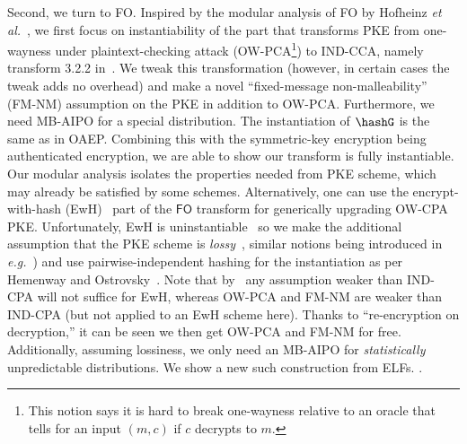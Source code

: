 Second, we turn to FO. Inspired by the modular analysis of FO by Hofheinz \emph{et al.}~\cite{TCC:HofHovKil17}, we first focus on instantiability of the part that transforms PKE from one-wayness under plaintext-checking attack (OW-PCA\footnote{This notion says it is hard to break one-wayness relative to an oracle that tells for an input $(m,c)$ if $c$ decrypts to $m$.}) to IND-CCA, namely transform 3.2.2 in~\cite{TCC:HofHovKil17}. 
We tweak this transformation (however, in certain cases the tweak adds no overhead) and make a novel  ``fixed-message non-malleability'' (FM-NM) assumption on the PKE in addition to OW-PCA.  Furthermore, we need MB-AIPO for a special distribution. The instantiation of $\hashG$ is the same as in OAEP. Combining this with the symmetric-key encryption being  authenticated encryption, we are able to show our transform is fully instantiable.  
Our modular analysis isolates the properties needed from PKE scheme, which may already be satisfied by some schemes.
Alternatively, one can use the encrypt-with-hash (EwH)~\cite{C:BelBolONe07} part of the $\mathsf{FO}$ transform for generically upgrading OW-CPA PKE. Unfortunately, EwH is uninstantiable~\cite{TCC:BrzFarMit15,FOCS:GoyKopWat17} so we make the additional assumption that the PKE scheme is \emph{lossy}~\cite{EC:BelHofYil09}, similar notions being introduced in \emph{e.g.}~\cite{TCC:KolNao08,C:PeiVaiWat08}) and use pairwise-independent hashing for the instantiation as per Hemenway and Ostrovsky~\cite[Corollary 2]{AC:HemOst13}.  Note that by~\cite{TCC:BrzFarMit15,FOCS:GoyKopWat17} any assumption weaker than IND-CPA will not suffice for EwH, whereas OW-PCA and FM-NM are weaker than IND-CPA (but not applied to an EwH scheme here).
Thanks to ``re-encryption on decryption,'' it can be seen we then get OW-PCA and FM-NM for free. 
Additionally, assuming lossiness, we only need an MB-AIPO for \emph{statistically} unpredictable distributions. We show a new such construction from ELFs.
. %

\fi

